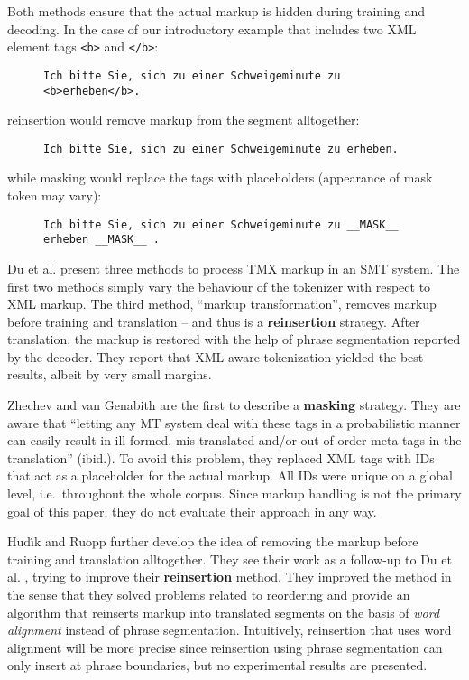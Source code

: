 \documentclass[11pt,letterpaper]{article}
\begin{document}
\noindent Both methods ensure that the actual markup is hidden during training and decoding. In the case of our introductory example that includes two XML element tags \texttt{<b>} and \texttt{</b>}:

\begin{figure}[h]
\texttt{Ich bitte Sie, sich zu einer Schweigeminute zu <b>erheben</b>.}
\end{figure}

\noindent reinsertion would remove markup from the segment alltogether:

\begin{figure}[h!]
\texttt{Ich bitte Sie, sich zu einer Schweigeminute zu erheben.}
\end{figure}

\noindent while masking would replace the tags with placeholders (appearance of mask token may vary):

\begin{figure}[h]
\texttt{Ich bitte Sie, sich zu einer Schweigeminute zu \_\_MASK\_\_ erheben \_\_MASK\_\_ .}
\end{figure}


\noindent Du et al.  present three methods to process TMX markup in an SMT system. The first two methods simply vary the behaviour of the tokenizer with respect to XML markup. The third method, ``markup transformation'', removes markup before training and translation -- and thus is a \textbf{reinsertion} strategy. After translation, the markup is restored with the help of phrase segmentation reported by the decoder. They report that XML-aware tokenization yielded the best results, albeit by very small margins.

Zhechev and van Genabith  are the first to describe a \textbf{masking} strategy. They are aware that ``letting any MT system deal with these tags in a probabilistic manner can easily result in ill-formed, mis-translated and/or out-of-order meta-tags in the translation'' (ibid.). To avoid this problem, they replaced XML tags with IDs that act as a placeholder for the actual markup. All IDs were unique on a global level, i.e.~throughout the whole corpus. Since markup handling is not the primary goal of this paper, they do not evaluate their approach in any way.

Hud{\'\i}k and Ruopp  further develop the idea of removing the markup before training and translation alltogether. They see their work as a follow-up to Du et al. , trying to improve their \textbf{reinsertion} method. They improved the method in the sense that they solved problems related to reordering and provide an algorithm that reinserts markup into translated segments on the basis of \textit{word alignment} instead of phrase segmentation. Intuitively, reinsertion that uses word alignment will be more precise since reinsertion using phrase segmentation can only insert at phrase boundaries, but no experimental results are presented.
\end{document}
